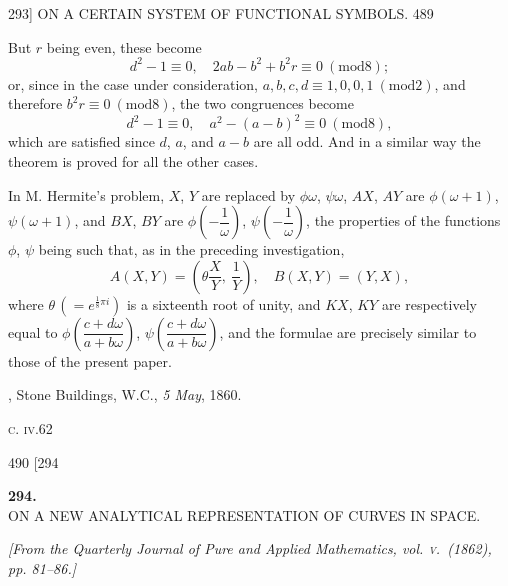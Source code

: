 \documentclass[11pt]{article}
\providecommand{\modd}{\mathrm{mod}}
\begin{document}
\newpage
\begin{center}
\textsc{293]} \hfill ON A CERTAIN SYSTEM OF FUNCTIONAL SYMBOLS. \hfill 489
\end{center}

But $r$ being even, these become
\[ d^{2}-1\equiv 0,\quad 2ab-b^{2}+b^{2}r\equiv 0\ (\modd 8); \]
or, since in the case under consideration, $a,b,c,d\equiv 1,0,0,1\ (\modd 2)$, and therefore
$b^{2}r\equiv 0\ (\modd 8)$, the two congruences become
\[ d^{2}-1\equiv 0,\quad a^{2}-(a-b)^{2}\equiv 0\ (\modd 8), \]
which are satisfied since $d$, $a$, and $a-b$ are all odd. And in a similar way the
theorem is proved for all the other cases.

In M. Hermite's problem, $X$, $Y$ are replaced by $\phi\omega$, $\psi\omega$, $AX$, $AY$ are $\phi(\omega+1)$,
$\psi(\omega+1)$, and $BX$, $BY$ are $\phi\!\left(-\dfrac{1}{\omega}\right)$, $\psi\!\left(-\dfrac{1}{\omega}\right)$, the properties of the functions $\phi$, $\psi$
being such that, as in the preceding investigation,
\[ A(X,Y) = \left(\theta\dfrac{X}{Y},\ \dfrac{1}{Y}\right),\quad B(X,Y)=(Y,X), \]
where $\theta\,(=e^{\frac{1}{8}\pi i})$ is a sixteenth root of unity, and $KX$, $KY$ are respectively equal to
$\phi\!\left(\dfrac{c+d\omega}{a+b\omega}\right)$, $\psi\!\left(\dfrac{c+d\omega}{a+b\omega}\right)$, and the formulae are precisely similar to those of the present
paper.

\medskip
{}, Stone Buildings, W.C., \textit{5 May}, 1860.

\medskip
\hfill\textsc{c. iv.}\hfill 62\hfill\hfill

\newpage
\begin{center}
490 \hfill \hfill \textsc{[294}
\end{center}

\begin{center}
\textbf{\large 294.}\\[1ex]
\textsc{ON A NEW ANALYTICAL REPRESENTATION OF CURVES IN SPACE.}
\end{center}

\begin{center}
\textit{[From the Quarterly Journal of Pure and Applied Mathematics, vol. \textsc{v}.\ (1862),
pp. 81--86.]}
\end{center}
\end{document}
